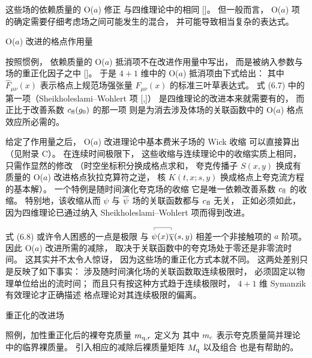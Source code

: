 这些场的依赖质量的 O($a$) 修正
与四维理论中的相同 [\cite{ImpNonD}]。
但一般而言，
O($a$) 项的确定需要仔细考虑场之间可能发生的混合，
并可能导致相当复杂的表达式。


\/ {\rm O($a$)\kern-0.5pt} 改进的格点作用量

按照惯例，
依赖质量的 O($a$) 抵消项不在改进作用量中写出，
而是被纳入参数与场的重正化因子之中 [\cite{SFimp}]。
于是 $4+1$ 维中的 O($a$) 抵消项由下式给出：
其中 $\widehat{F}_{\mu\nu}(x)$ 表示格点上规范场强张量
$F_{\mu\nu}(x)$ 的标准三叶草表达式。
式 (6.7) 中的第一项（Sheikholeslami--Wohlert 项
[\cite{SW},\cite{SFimp}]）
是四维理论的改进本来就需要有的，
而正比于改善系数 $c_{\rm fl}(g_0)$ 的那一项
则是为消去涉及体场的关联函数中的 O($a$) 格点效应所必需的。

给定了作用量之后，
O($a$) 改进理论中基本费米子场的 Wick 收缩
可以直接算出（见附录 C）。
在连续时间极限下，
这些收缩与连续理论中的收缩实质上相同，
只需作显然的修改
（时空坐标积分换成格点求和，
夸克传播子 $S(x,y)$ 换成有质量的 O($a$) 改进格点狄拉克算符之逆，
核 $K(t,x;s,y)$ 换成格点上夸克流方程的基本解）。
一个特例是随时间演化夸克场的收缩
它是唯一依赖改善系数 $c_{\rm fl}$ 的收缩。
特别地，该收缩从而 $\psi$ 与 $\overline{\psi}$
场的关联函数都与 $c_{\rm fl}$ 无关，
正如必须如此，
因为四维理论已通过纳入 Sheikholeslami--Wohlert 项而得到改进。

式 (6.8) 或许令人困惑的一点是极限
与 $\wick{\psi(x)\chibar(s,y)}$ 相差一个非接触项的
$a$ 阶项。
因此 O($a$) 改进所需的减除，
取决于关联函数中的夸克场处于零还是非零流时间。
这其实并不太令人惊讶，
因为这些场的重正化方式本就不同。
这两处差别只是反映了如下事实：
涉及随时间演化场的关联函数取连续极限时，
必须固定以物理单位给出的流时间；
而且只有按这种方式趋于连续极限时，
$4+1$ 维 Symanzik 有效理论才正确描述
格点理论对其连续极限的偏离。


 重正化的改进场

照例，加性重正化后的裸夸克质量 $m_{{\rm q},r}$ 定义为
其中 $m_{\rm c}$ 表示夸克质量简并理论中的临界裸质量。
引入相应的减除后裸质量矩阵 $M_{\rm q}$
以及组合
也是有帮助的。

